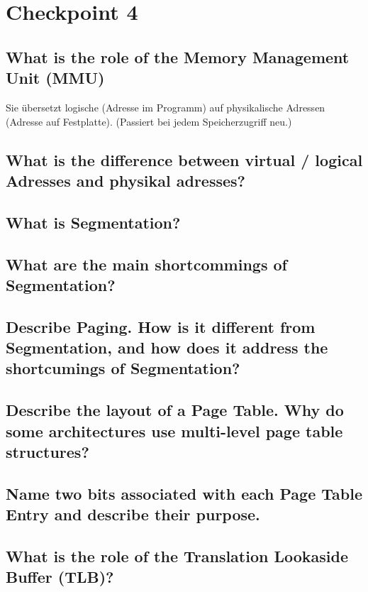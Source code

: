 \section{Checkpoint 4}

\addtocounter{subsection}{1}

\subsection{What is the role of the Memory Management Unit (MMU)}
Sie übersetzt logische (Adresse im Programm) auf physikalische Adressen (Adresse auf Festplatte).
(Passiert bei jedem Speicherzugriff neu.)

\subsection{What is the difference between virtual / logical Adresses and physikal adresses?}

\subsection{What is Segmentation?}

\subsection{What are the main shortcommings of Segmentation?}

\subsection{Describe Paging. How is it different from Segmentation, and how does it address the shortcumings of Segmentation?}

\subsection{Describe the layout of a Page Table. Why do some architectures use multi-level page table structures?}

\subsection{Name two bits associated with each Page Table Entry and describe their purpose.}

\subsection{What is the role of the Translation Lookaside Buffer (TLB)?}


